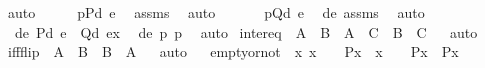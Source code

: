\begin{isabellebody}
\ auto\isanewline
\ \ \isamarkupfalse%
\ \isamarkupfalse%
\ p{}{\isacharcolon}{\kern0pt}{\isachardoublequoteopen}P{\isacharparenleft}{\kern0pt}d{\isacharcomma}{\kern0pt}\ e{\isacharparenright}{\kern0pt}{\isachardoublequoteclose}\ \isamarkupfalse%
\ assms\ \isamarkupfalse%
\ auto\ \isanewline
\ \ \isamarkupfalse%
\ \isamarkupfalse%
\ p{}{\isacharcolon}{\kern0pt}{\isachardoublequoteopen}Q{\isacharparenleft}{\kern0pt}d{\isacharcomma}{\kern0pt}\ e{\isacharparenright}{\kern0pt}{\isachardoublequoteclose}\ \isamarkupfalse%
\ de\ assms\ \isamarkupfalse%
\ auto\ \isanewline
\ \ \isamarkupfalse%
\ \isamarkupfalse%
\ {\isachardoublequoteopen}\ {\isacharparenleft}{\kern0pt}{\isasymlambda}{\isasymlangle}d{\isacharcomma}{\kern0pt}e{\isasymrangle}{\isachardot}{\kern0pt}\ P{\isacharparenleft}{\kern0pt}d{\isacharcomma}{\kern0pt}\ e{\isacharparenright}{\kern0pt}\ {\isasymand}\ Q{\isacharparenleft}{\kern0pt}d{\isacharcomma}{\kern0pt}\ e{\isacharparenright}{\kern0pt}{\isacharparenright}{\kern0pt}{\isacharparenleft}{\kern0pt}x{\isacharparenright}{\kern0pt}{\isachardoublequoteclose}\ \isamarkupfalse%
\ de\ p{}\ p{}\ \isamarkupfalse%
\ auto\isanewline
{}\isamarkupfalse%
%
\endisatagproof
{\isafoldproof}%
%
\isadelimproof
\isanewline
%
\endisadelimproof
\isanewline
{}\isamarkupfalse%
\ inter{\isacharunderscore}{\kern0pt}eq\ {\isacharcolon}{\kern0pt}\ {\isachardoublequoteopen}A\ {\isacharequal}{\kern0pt}\ B\ {\isasymLongrightarrow}\ A\ {\isasyminter}\ C\ {\isacharequal}{\kern0pt}\ B\ {\isasyminter}\ C{\isachardoublequoteclose}%
\isadelimproof
\ %
\endisadelimproof
%
\isatagproof
{}\isamarkupfalse%
\ auto%
\endisatagproof
{\isafoldproof}%
%
\isadelimproof
%
\endisadelimproof
\ \isanewline
\isanewline
{}\isamarkupfalse%
\ iff{\isacharunderscore}{\kern0pt}flip\ {\isacharcolon}{\kern0pt}\ {\isachardoublequoteopen}A\ {\isasymlongleftrightarrow}\ B\ {\isasymLongrightarrow}\ B\ {\isasymlongleftrightarrow}\ A{\isachardoublequoteclose}%
\isadelimproof
\ %
\endisadelimproof
%
\isatagproof
{}\isamarkupfalse%
\ auto%
\endisatagproof
{\isafoldproof}%
%
\isadelimproof
%
\endisadelimproof
\ \isanewline
\isanewline
{}\isamarkupfalse%
\ empty{\isacharunderscore}{\kern0pt}or{\isacharunderscore}{\kern0pt}not\ {\isacharcolon}{\kern0pt}\ {\isachardoublequoteopen}{\isasymAnd}x{\isachardot}{\kern0pt}\ {\isacharparenleft}{\kern0pt}x\ {\isacharequal}{\kern0pt}\ {}\ {\isasymlongrightarrow}\ P{\isacharparenleft}{\kern0pt}x{\isacharparenright}{\kern0pt}{\isacharparenright}{\kern0pt}\ {\isasymLongrightarrow}\ {\isacharparenleft}{\kern0pt}x\ {\isasymnoteq}\ {}\ {\isasymlongrightarrow}\ P{\isacharparenleft}{\kern0pt}x{\isacharparenright}{\kern0pt}{\isacharparenright}{\kern0pt}\ {\isasymLongrightarrow}\ P{\isacharparenleft}{\kern0pt}x{\isacharparenright}{\kern0pt}{\isachardoublequoteclose}\isanewline

\end{isabellebody}
